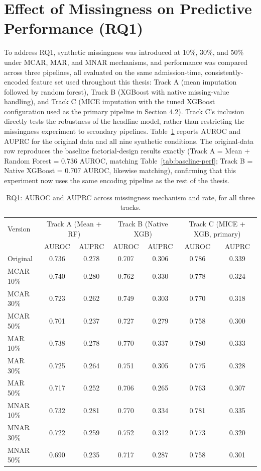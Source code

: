 \documentclass[12pt,a4paper]{report}
\begin{document}
\section{Effect of Missingness on Predictive Performance (RQ1)}
To address RQ1, synthetic missingness was introduced at 10\%, 30\%, and 50\% under MCAR, MAR, and MNAR mechanisms, and performance was compared across three pipelines, all evaluated on the same admission-time, consistently-encoded feature set used throughout this thesis: Track A (mean imputation followed by random forest), Track B (XGBoost with native missing-value handling), and Track C (MICE imputation with the tuned XGBoost configuration used as the primary pipeline in Section 4.2). Track C's inclusion directly tests the robustness of the headline model, rather than restricting the missingness experiment to secondary pipelines. Table~\ref{tab:rq1-missingness} reports AUROC and AUPRC for the original data and all nine synthetic conditions. The original-data row reproduces the baseline factorial-design results exactly (Track A = Mean + Random Forest = 0.736 AUROC, matching Table~\ref{tab:baseline-perf}; Track B = Native XGBoost = 0.707 AUROC, likewise matching), confirming that this experiment now uses the same encoding pipeline as the rest of the thesis.


\begin{table}[H]
\centering
\caption{RQ1: AUROC and AUPRC across missingness mechanism and rate, for all three tracks.}
\label{tab:rq1-missingness}
\small
\begin{tabular}{lcccccc}
\toprule
Version & \multicolumn{2}{c}{Track A (Mean + RF)} & \multicolumn{2}{c}{Track B (Native XGB)} & \multicolumn{2}{c}{Track C (MICE + XGB, primary)} \\
 & AUROC & AUPRC & AUROC & AUPRC & AUROC & AUPRC \\
\midrule
Original & 0.736 & 0.278 & 0.707 & 0.306 & 0.786 & 0.339 \\
MCAR 10\% & 0.740 & 0.280 & 0.762 & 0.330 & 0.778 & 0.324 \\
MCAR 30\% & 0.723 & 0.262 & 0.749 & 0.303 & 0.770 & 0.318 \\
MCAR 50\% & 0.701 & 0.237 & 0.727 & 0.279 & 0.758 & 0.300 \\
MAR 10\% & 0.738 & 0.278 & 0.770 & 0.337 & 0.780 & 0.333 \\
MAR 30\% & 0.725 & 0.264 & 0.751 & 0.305 & 0.775 & 0.328 \\
MAR 50\% & 0.717 & 0.252 & 0.706 & 0.265 & 0.763 & 0.307 \\
MNAR 10\% & 0.732 & 0.281 & 0.770 & 0.334 & 0.781 & 0.335 \\
MNAR 30\% & 0.722 & 0.259 & 0.752 & 0.312 & 0.773 & 0.320 \\
MNAR 50\% & 0.690 & 0.235 & 0.717 & 0.287 & 0.758 & 0.301 \\
\bottomrule
\end{tabular}
\end{table}
\end{document}
